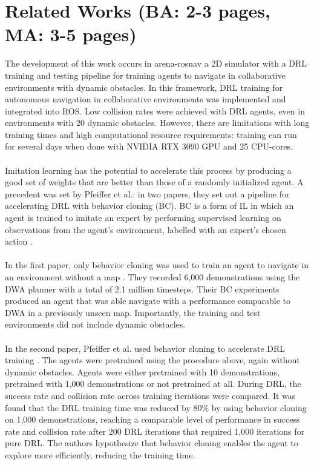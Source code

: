 \chapter{Related Works (BA: 2-3 pages, MA: 3-5 pages)}
The development of this work occurs in arena-rosnav \citep{rosnav} a 2D simulator with a DRL training and testing pipeline for training agents to navigate in collaborative environments with dynamic obstacles. In this framework, \citep{kastner} DRL training for autonomous navigation in collaborative environments was implemented and integrated into ROS. Low collision rates were achieved with DRL agents, even in environments with 20 dynamic obstacles. However, there are limitations with long training times and high computational resource requirements: training can run for several days when done with NVIDIA RTX 3090 GPU and 25 CPU-cores.
\\\\\noindent 
Imitation learning has the potential to accelerate this process by producing a good set of weights that are better than those of a randomly initialized agent. A precedent was set by Pfeiffer et al.: in two papers, they set out a pipeline for accelerating DRL with behavior cloning (BC). BC is a form of IL in which an agent is trained to imitate an expert by performing supervised learning on observations from the agent’s environment, labelled with an expert’s chosen action \citep{abbeel}.
\\\\\noindent 
In the first paper, only behavior cloning was used to train an agent to navigate in an environment without a map \citep{pfeiffer1}. They recorded 6,000 demonstrations using the DWA planner with a total of 2.1 million timesteps. Their BC experiments produced an agent that was able navigate with a performance comparable to DWA in a previously unseen map. Importantly, the training and test environments did not include dynamic obstacles.
\\\\\noindent 
In the second paper, Pfeiffer et al. used behavior cloning to accelerate DRL training \citep{pfeiffer2}. The agents were pretrained using the procedure above, again without dynamic obstacles. Agents were either pretrained with 10 demonstrations, pretrained with 1,000 demonstrations or not pretrained at all. During DRL, the success rate and collision rate across training iterations were compared. It was found that the DRL training time was reduced by 80\% by using behavior cloning on 1,000 demonstrations, reaching a comparable level of performance in success rate and collision rate after 200 DRL iterations that required 1,000 iterations for pure DRL. The authors hypothesize that behavior cloning enables the agent to explore more efficiently, reducing the training time.
